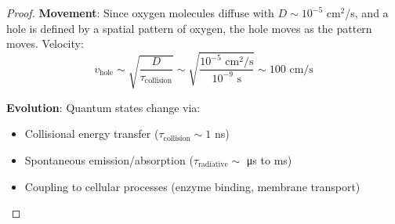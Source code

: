 \begin{proof}
\textbf{Movement}: Since oxygen molecules diffuse with $D \sim 10^{-5}$ cm$^2$/s, and a hole is defined by a spatial pattern of oxygen, the hole moves as the pattern moves. Velocity:
\begin{equation}
v_{\text{hole}} \sim \sqrt{\frac{D}{\tau_{\text{collision}}}} \sim \sqrt{\frac{10^{-5} \text{ cm}^2/\text{s}}{10^{-9} \text{ s}}} \sim 100 \text{ cm/s}
\end{equation}

\textbf{Evolution}: Quantum states change via:
\begin{itemize}
\item Collisional energy transfer ($\tau_{\text{collision}} \sim 1$ ns)
\item Spontaneous emission/absorption ($\tau_{\text{radiative}} \sim$ μs to ms)
\item Coupling to cellular processes (enzyme binding, membrane transport)
\end{itemize}


\end{proof}
